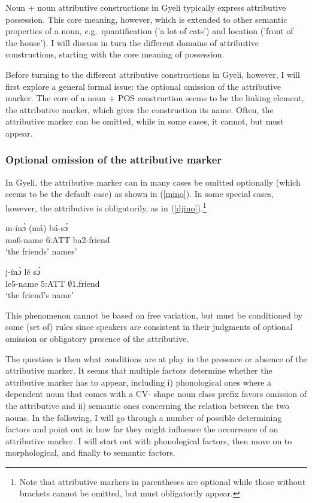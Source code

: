 Noun + noun attributive constructions in Gyeli typically express attributive possession. This core meaning, however, which is extended to other semantic properties of a noun, e.g.~quantification ('a lot of cats') and location ('front of the house'). I will discuss in turn the different domains of attributive constructions, starting with the core meaning of possession.

Before turning to the different attributive constructions in Gyeli, however, I will first explore a general formal issue: the optional omission of the attributive marker. The core of a noun + POS construction seems to be the linking element, the attributive marker, which gives the construction its name. Often, the attributive marker can be omitted, while in some cases, it cannot, but must appear. 


\subsubsection{Optional omission of the attributive marker}
\label{sec:CONOM}

 In Gyeli, the attributive marker can in many cases be omitted optionally (which seems to be the default case) as shown in (\ref{mino}). In some special cases, however, the attributive is obligatorily, as in (\ref{djino}).\footnote{Note that attributive markers in parentheses are optional while those without brackets cannot be omitted, but must obligatorily appear.} 

\begin{exe}
\ex\label{mino} 
  \gll     m-ínɔ̀ (má) bá-sɔ́ \\
              ma6-name 6:ATT  ba2-friend\\
    \trans `the friends' names'
\end{exe}

\begin{exe}
\ex\label{djino} 
  \gll     j-ínɔ̀ lé sɔ́ \\
              le5-name 5:ATT  $\emptyset$1.friend\\
    \trans `the friend's name'
\end{exe}

\noindent This phenomenon cannot be based on free variation, but must be conditioned by some (set of) rules since speakers are consistent in their judgments of optional omission or obligatory presence of the attributive.

The question is then what conditions are at play in the presence or absence of the attributive marker. It seems that multiple factors determine whether the attributive marker has to appear, including i) phonological ones where a dependent noun that comes with a CV- shape noun class prefix favors omission of the attributive and ii) semantic ones concerning the relation between the two nouns. In the following, I will go through a number of possible determining factors and point out in how far they might influence the occurrence of an attributive marker. I will start out with phonological factors, then move on to morphological, and finally to semantic factors.

